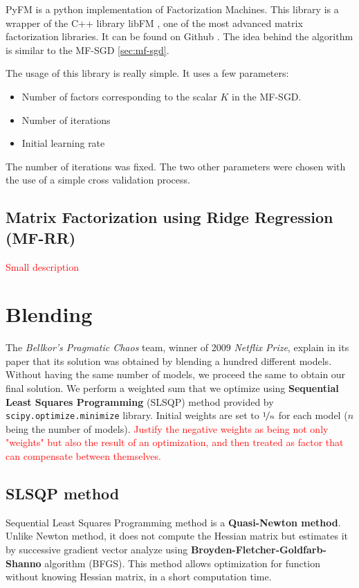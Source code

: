 \documentclass[10pt,conference,compsocconf]{IEEEtran}
\begin{document}
PyFM is a python implementation of Factorization Machines. This library is a wrapper of the C++ library libFM \cite{rendle:tist2012}, one of the most advanced matrix factorization libraries. It can be found on Github \cite{pyfm}. The idea behind the algorithm is similar to the MF-SGD \ref{sec:mf-sgd}. 

The usage of this library is really simple. It uses a few parameters:
\begin{itemize}
 \item Number of factors corresponding to the scalar $K$ in the MF-SGD.
 \item Number of iterations
 \item Initial learning rate
\end{itemize}

The number of iterations was fixed. The two other parameters were chosen with the use of a simple cross validation process.

\subsection{Matrix Factorization using Ridge Regression (MF-RR)}

\textcolor{red}{Small description}

\section{Blending}
\label{sec:blending}

The \textit{Bellkor's Pragmatic Chaos} team, winner of 2009 \textit{Netflix Prize}, explain in its paper that its solution was obtained by blending a hundred different models. \cite{BellKore_netflix} Without having the same number of models, we proceed the same to obtain our final solution. We perform a weighted sum that we optimize using \textbf{Sequential Least Squares Programming} (SLSQP) method provided by \texttt{scipy.optimize.minimize} library. Initial weights are set to $\nicefrac{1}{n}$ for each model ($n$ being the number of models). \textcolor{red}{Justify the negative weights as being not only "weights" but also the result of an optimization, and then treated as factor that can compensate between themselves.}

\subsection{SLSQP method}
Sequential Least Squares Programming method is a \textbf{Quasi-Newton method}. Unlike Newton method, it does not compute the Hessian matrix but estimates it by successive gradient vector analyze \cite{wiki:quasi_newton} using \textbf{Broyden-Fletcher-Goldfarb-Shanno} algorithm (BFGS). This method allows optimization for function without knowing Hessian matrix, in a short computation time.
\end{document}
